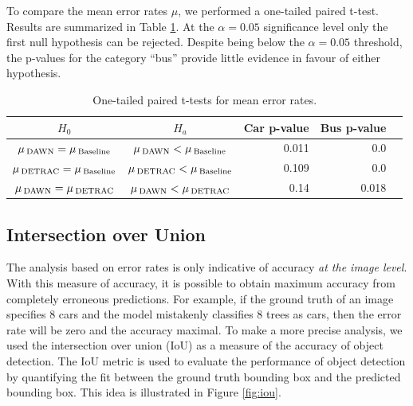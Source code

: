 \documentclass[]{article}
\begin{document}
	
	To compare the mean error rates $\mu$, we performed a one-tailed paired t-test. Results are summarized in Table \ref{table:t-test}.	At the $\alpha=0.05$ significance level only the first null hypothesis can be rejected. Despite being below the $\alpha=0.05$ threshold, the p-values for the category ``bus'' provide little evidence in favour of either hypothesis.
	
	
	\begin{table}[H]
		\centering
		\begin{tabular}{ccrrp{1.5in}}
			\toprule
			\textbf{$H_0$} & \textbf{$H_a$} & Car p-value & Bus p-value \\
			\midrule
			$\mu\,\textsubscript{DAWN} = \mu\,\textsubscript{Baseline}$   & $\mu\,\textsubscript{DAWN} < \mu\,\textsubscript{Baseline}$   & 0.011 & 0.0   \\
			$\mu\,\textsubscript{DETRAC} = \mu\,\textsubscript{Baseline}$ & $\mu\,\textsubscript{DETRAC} < \mu\,\textsubscript{Baseline}$ &  0.109 & 0.0 \\
			$\mu\,\textsubscript{DAWN} = \mu\,\textsubscript{DETRAC}$ & $\mu\,\textsubscript{DAWN} < \mu\,\textsubscript{DETRAC}$ &  0.14  & 0.018 \\
			\bottomrule
		\end{tabular}
		\caption{One-tailed paired t-tests for mean error rates.}
		\label{table:t-test}
	\end{table}
	 
\subsection{Intersection over Union}  
	
	The analysis based on error rates is only indicative of accuracy \emph{at the image level}. With this measure of accuracy, it is possible to obtain maximum accuracy from completely erroneous predictions. For example, if the ground truth of an image specifies 8 cars and the model mistakenly classifies 8 trees as cars, then the error rate will be zero and the accuracy maximal. To make a more precise analysis, we used the intersection over union (IoU) as a measure of the accuracy of object detection. The IoU metric is used to evaluate the performance of object detection by quantifying the fit between the ground truth bounding box and the predicted bounding box. This idea is illustrated in Figure \ref{fig:iou}.
	
\end{document}

